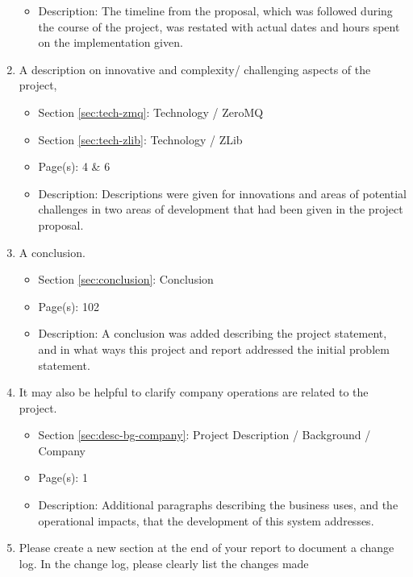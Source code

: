\documentclass[11pt]{article}
\begin{document}
\begin{enumerate}
\begin{itemize}
            \item Description: The timeline from the proposal, which was
              followed during the course of the project, was restated with
              actual dates and hours spent on the implementation given.
          \end{itemize}
        \item A description on innovative and complexity/ challenging aspects
          of the project,
          \begin{itemize}
            \item Section \ref{sec:tech-zmq}: Technology / ZeroMQ
            \item Section \ref{sec:tech-zlib}: Technology / ZLib
            \item Page(s): 4 \& 6
            \item Description: Descriptions were given for innovations and
              areas of potential challenges in two areas of development that
              had been given in the project proposal.
          \end{itemize}
        \item A conclusion.
          \begin{itemize}
            \item Section \ref{sec:conclusion}: Conclusion
            \item Page(s): 102
            \item Description: A conclusion was added describing the project
              statement, and in what ways this project and report addressed the
              initial problem statement.
          \end{itemize}
        \item It may also be helpful to clarify company operations are related to the
          project.
          \begin{itemize}
            \item Section \ref{sec:desc-bg-company}: Project Description / Background / Company
            \item Page(s): 1
            \item Description: Additional paragraphs describing the business
              uses, and the operational impacts, that the development of this
              system addresses.
          \end{itemize}
        \item Please create a new section at the end of your report to document
          a change log. In the change log, please clearly list the changes made

\end{enumerate}
\end{document}
